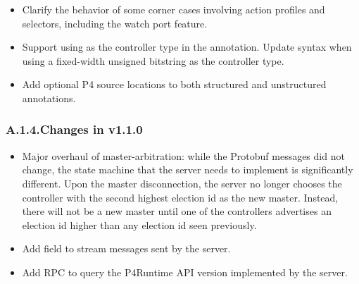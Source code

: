 \documentclass[11pt]{article}
\begin{document}
{\begin{itemize}[noitemsep,topsep=\mdcompacttopsep]
\item{}Clarify the behavior of some corner cases involving action profiles and
selectors, including the watch port feature.%

\item{}Support using  as the controller type in the 
annotation. Update syntax when using a fixed-width unsigned bitstring as the
controller type.%

\item{}Add optional P4 source locations to both structured and unstructured
annotations.%
\end{itemize}%

\subsubsection{A.1.4.\hspace*{0.5em}Changes in v1.1.0}\label{sec-changes-in-v110}%

\begin{itemize}[noitemsep,topsep=\mdcompacttopsep]%

\item{}Major overhaul of master-arbitration: while the Protobuf messages did not
change, the state machine that the server needs to implement is significantly
different. Upon the master disconnection, the server no longer chooses the
controller with the second highest election id as the new master. Instead,
there will not be a new master until one of the controllers advertises an
election id higher than any election id seen previously.%

\item{}Add  field to stream messages sent by the server.%

\item{}Add  RPC to query the P4Runtime API version implemented by the
server.%


\end{itemize}}
\end{document}
